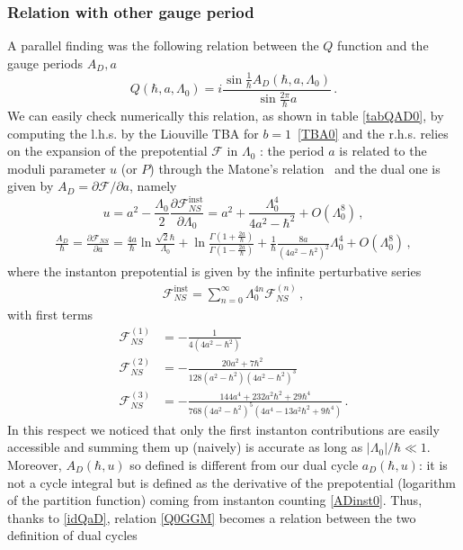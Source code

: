 \documentclass[11pt,a4paper]{elsarticle}
\def \ba {\begin{aligned}}
\def \ea {\end{aligned}}
\newcommand{\be}{\begin{equation}}
\newcommand{\ee}{\end{equation}}
\numberwithin{figure}{section}
\numberwithin{table}{section}
\begin{document}
\subsubsection{Relation with other gauge period}
 
A parallel finding was the following relation between the $Q$ function and
the gauge periods $A_D,a$~\cite{GrassiGuMarino} 
\be  \label{Q0GGM}
Q(\hbar,a, \Lambda_0) =i \frac{\sin \frac{1}{\hbar}A_D(\hbar,a,\Lambda_0)}{\sin  \frac{2\pi }{\hbar} a}\,. 
\ee  
We can easily check numerically this relation, as shown in table \ref{tabQAD0}, by computing the l.h.s. by the Liouville TBA for $b=1$~\eqref{TBA0} and the r.h.s. relies on the expansion of the prepotential $\mathcal{F}$ in $\Lambda_0$ \cite{Nekrasov:2002,NekrasovOkounkov:2003}: the period $a$ is related to the moduli parameter $u$ (or $P$) through the Matone's relation~\cite{Matone:1995,FlumeFucitoMoralesPoghossian:2004} and the dual one is given by $A_D=\partial{\mathcal{F}}/{\partial a} $, namely  
\be  \label{MatoneInst0}
 u =  a^2 - \frac{\Lambda_0}{2} \frac{\partial \mathcal{F}_{NS}^{\mathrm{inst}}}{\partial \Lambda_0} = a^2+\frac{\Lambda_0^4}{ 4 a^2-\hbar^2 }+O(\Lambda_0^8)\,,
\ee 
\be 
\ba \label{ADinst0}
\frac{A_D}{\hbar} =   \frac{\partial \mathcal{F}_{NS}}{ \partial a}=\frac{4 a}{\hbar} \ln \frac{\sqrt{2} \hbar}{\Lambda_0}  + \ln \frac{\Gamma(1 + \frac{2 a}{\hbar})}{\Gamma(1 - \frac{2 a}{\hbar})} + \frac{1}{\hbar}\frac{ 8 a}{(4 a^2 - \hbar^2)^2} \Lambda_0^4 + O(\Lambda_0^8)\,,
\ea 
\ee 
where the instanton prepotential is given by the infinite perturbative series
\be
\ba 
\mathcal{F}_{NS}^{\mathrm{inst}} = \sum_{n=0}^\infty \Lambda_0^{4n} \mathcal{F}_{NS}^{(n)}\,,
\ea 
\ee
with first terms 
\be 
\ba 
\mathcal{F}_{NS}^{(1)} &=- \frac{1}{4(4 a^2- \hbar^2)} \\
\mathcal{F}_{NS}^{(2)} &=- \frac{20 a^2+7 \hbar^2}{128(a^2-\hbar^2)(4a^2-\hbar^2)^3} \\
\mathcal{F}_{NS}^{(3)} &=- \frac{144 a^4+232 a^2\hbar^2+29 \hbar^4}{768(4a^2-\hbar^2)^5(4a^4-13 a^2\hbar^2+9\hbar^4)}\,.
\ea 
\ee
In this respect we noticed that only the first instanton contributions are easily accessible and summing them up (naively) is accurate as long as $|\Lambda_0|/\hbar \ll 1$. Moreover, $A_D(\hbar,u) $ so defined is different from our dual cycle $a_D(\hbar,u) $: it is not a cycle integral but is defined as the derivative of the prepotential (logarithm of the partition function) coming from instanton counting \eqref{ADinst0}.
Thus, thanks to \eqref{idQaD}, relation \eqref{Q0GGM} becomes a relation between the two definition of dual cycles%
\end{document}
